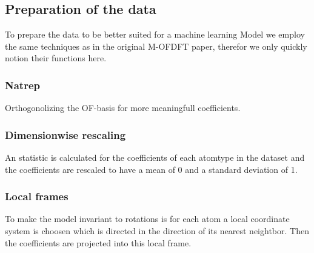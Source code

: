 \subsection{Preparation of the data}
To prepare the data to be better suited for a machine learning Model we employ the same techniques as in the original M-OFDFT\cite{zhang_m-ofdft_2023} paper, therefor we only quickly notion their functions here.
\subsubsection{Natrep}
Orthogonolizing the OF-basis for more meaningfull coefficients.
\subsubsection{Dimensionwise rescaling}
An statistic is calculated for the coefficients of each atomtype in the dataset and the coefficients are rescaled to have a mean of 0 and a standard deviation of 1.
\subsubsection{Local frames}
To make the model invariant to rotations is for each atom a local coordinate system is choosen which is directed in the direction of its nearest neightbor. Then the coefficients are projected into this local frame.

